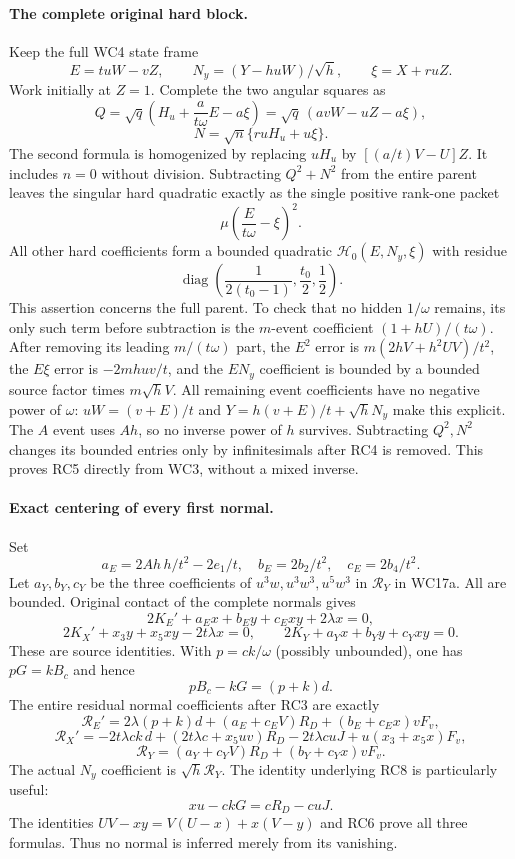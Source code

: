 \paragraph{The complete original hard block.}
Keep the full WC4 state frame
\[
 E=tuW-vZ,\qquad N_y=(Y-huW)/\sqrt h,\qquad
 \xi=X+ruZ.
\]
Work initially at $Z=1$. Complete the two angular squares as
\[
 Q=\sqrt q\left(H_u+\frac{a}{t\omega}E-a\xi\right)
   =\sqrt q\,(avW-uZ-a\xi),
\]
\[
 N=\sqrt n\{r uH_u+u\xi\}.
 \tag{RC3}
\]
The second formula is homogenized by replacing $uH_u$ by
$[(a/t)V-U]Z$. It includes $n=0$ without division.
Subtracting $Q^2+N^2$ from the entire parent leaves the singular
hard quadratic exactly as the single positive rank-one packet
\[
 \mu\left(\frac{E}{t\omega}-\xi\right)^2.
 \tag{RC4}
\]
All other hard coefficients form a bounded quadratic
$\mathcal H_0(E,N_y,\xi)$ with residue
\[
 \operatorname{diag}\left(\frac1{2(t_0-1)},\frac{t_0}2,
                                     \frac12\right).
 \tag{RC5}
\]
This assertion concerns the full parent. To check that no hidden
$1/\omega$ remains, its only such term before subtraction is the
$m$-event coefficient $(1+hU)/(t\omega)$.
After removing its leading $m/(t\omega)$ part, the $E^2$ error is
$m(2hV+h^2UV)/t^2$, the $E\xi$ error is $-2mh uv/t$,
and the $EN_y$ coefficient is bounded by a bounded source factor
times $m\sqrt hV$. All remaining event coefficients have no
negative power of $\omega$: $uW=(v+E)/t$ and
$Y=h(v+E)/t+\sqrt hN_y$ make this explicit. The $A$ event uses
$Ah$, so no inverse power of $h$ survives. Subtracting $Q^2,N^2$
changes its bounded entries only by infinitesimals after RC4 is
removed. This proves RC5 directly from WC3, without a mixed inverse.

\paragraph{Exact centering of every first normal.}
Set
\[
 a_E=2Ah\,h/t^2-2e_1/t,\quad b_E=2b_2/t^2,
 \quad c_E=2b_4/t^2.
\]
Let $a_Y,b_Y,c_Y$ be the three coefficients of
$u^3w,u^3w^3,u^5w^3$ in $\mathcal R_Y$ in WC17a.
All are bounded. Original contact of the complete normals gives
\[
 2K_E'+a_Ex+b_Ey+c_Exy+2\lambda x=0,
\]
\[
 2K_X'+x_3y+x_5xy-2t\lambda x=0,
 \qquad 2K_Y+a_Yx+b_Yy+c_Yxy=0.
 \tag{RC6}
\]
These are source identities. With $p=ck/\omega$ (possibly
unbounded), one has $pG=kB_c$ and hence
\[
 pB_c-kG=(p+k)d.
\]
The entire residual normal coefficients after RC3 are exactly
\[
 \mathcal R_E'=2\lambda(p+k)d
 +(a_E+c_EV)R_D+(b_E+c_Ex)vF_v,
 \tag{RC7}
\]
\[
 \mathcal R_X'=-2t\lambda ck\,d
 +(2t\lambda c+x_5uv)R_D-2t\lambda cuJ
                    +u(x_3+x_5x)F_v,
 \tag{RC8}
\]
\[
 \mathcal R_Y=(a_Y+c_YV)R_D+(b_Y+c_Yx)vF_v.
 \tag{RC9}
\]
The actual $N_y$ coefficient is $\sqrt h\mathcal R_Y$.
The identity underlying RC8 is particularly useful:
\[
                  xu-ckG=cR_D-cuJ.
\]
The identities $UV-xy=V(U-x)+x(V-y)$ and RC6 prove all three
formulas. Thus no normal is inferred merely from its vanishing.

